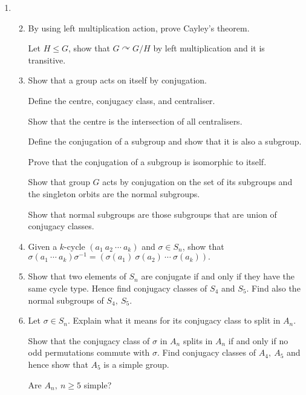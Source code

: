 \documentclass{article}
\newlength{\qspace}
\newcounter{qnumber}
\newenvironment{question}%
 {\vspace{\qspace}
  \begin{enumerate}[\bfseries 1\quad][10]%
    \setcounter{enumi}{\value{qnumber}}%
    \item%
 }
{
  \end{enumerate}
  \filbreak
  \stepcounter{qnumber}
 }
\newenvironment{questionparts}[1][1]%
 {
  \begin{enumerate}[\bfseries (i)]%
    \setcounter{enumii}{#1}
    \addtocounter{enumii}{-1}
    \setlength{\parskip}{3pt}
 }
 {
  \end{enumerate}
 }
\def\le{\leqslant}
\def\ge{\geqslant}
\begin{document}
\begin{question}
  \begin{questionparts}
    \item By using left multiplication action, prove Cayley's theorem. 
    
    Let $H\le G$, show that $G \curvearrowright G/H$ by left multiplication and it is transitive.
    \item Show that a group acts on itself by conjugation. 
    
    Define the centre, conjugacy class, and centraliser. 
    
    Show that the centre is the intersection of all centralisers.
    
    Define the conjugation of a subgroup and show that it is also a subgroup. 
    
    Prove that the conjugation of a subgroup is isomorphic to itself. 
    
    Show that group $G$ acts by conjugation on the set of its subgroups and the singleton orbits are the normal subgroups. 
    
    Show that normal subgroups are those subgroups that are union of conjugacy classes.
    \item Given a $k$-cycle $(a_1\ a_2\ \cdots\ a_k)$ and $ \sigma\in S_n $, show that $ \sigma(a_1\ \cdots \ a_k)\sigma^{-1}=(\sigma(a_1)\ \sigma(a_2)\ \cdots\ \sigma(a_k)). $
    \item Show that two elements of $S_n$ are conjugate if and only if they have the same cycle type. Hence find conjugacy classes of $S_4$ and $ S_5 $. Find also the normal subgroups of $ S_4,\ S_5 $.
    \item Let $ \sigma\in S_n $. Explain what it means for its conjugacy class to split in $A_n$. 
    
    Show that the conjugacy class of $ \sigma $ in $A_n$ splits in $A_n$ if and only if no odd permutations commute with $\sigma$. Find conjugacy classes of $ A_4,\ A_5 $ and hence show that $A_5$ is a simple group. 

    Are $ A_n,\ n\ge 5 $ simple?
  \end{questionparts}
\end{question}
\end{document}
